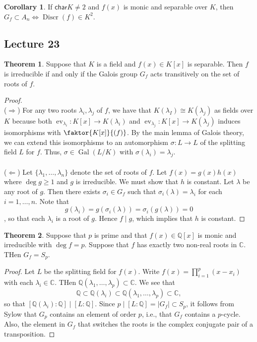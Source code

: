 \documentclass[10pt,letterpaper,cm]{nupset}
\theoremstyle{definition}
\newtheorem{theorem}{Theorem}
\newtheorem{corollary}{Corollary}
\newcommand{\C}{\mathbb C}
\newcommand{\Q}{\mathbb Q}
\newcommand{\1}{\mathbf{1}}
\newcommand{\0}{\vec 0}
\newcommand{\Char}{\mathsf{char}}
\DeclareMathOperator{\gal}{Gal}
\DeclareMathOperator{\ev}{ev}
\DeclareMathOperator{\disc}{Discr}
\begin{document}
\begin{corollary}
If $\Char{K} \ne 2$ and $f(x)$ is monic and separable over $K$, then $G_f \subset A_n \iff \disc(f) \in K^2$. 
\end{corollary}

\subsection{Lecture 23}

\begin{theorem}
Suppose that $K$ is a field and $f(x) \in K[x]$ is separable. Then $f$ is irreducible if and only if the Galois group $G_f$ acts transitively on the set of roots of $f$.  
\end{theorem}
\begin{proof} $ $
\\ ($\Longrightarrow$) For any two roots $\lambda_i, \lambda_j$ of $f$, we have that $K(\lambda_I) \cong K(\lambda_j)$ as fields over $K$ because both $\ev_{\lambda_i} : K[x] \to K(\lambda_i)$ and $\ev_{\lambda_j} : K[x] \to K(\lambda_j)$ induces isomorphisms with $\faktor{K[x]}{(f)}$. By the main lemma of Galois theory, we can extend this isomorphisms to an automorphism $\sigma : L \to L$ of the splitting field $L$ for $f$. Thus, $\sigma \in \gal(L/K)$ with $\sigma(\lambda_i) = \lambda_j$. 
\\ \\
($\Longleftarrow$) Let $\{\lambda_1, \ldots, \lambda_n\}$ denote the set of roots of $f$. Let $f(x) = g(x)h(x)$ where $\deg{g} \geq 1$ and $g$ is irreducible. We must show that $h$ is constant. Let $\lambda$ be any root of $g$. Then there exists $\sigma_i \in G_f$ such that $\sigma_i(\lambda) = \lambda_i$ for each $i=1, \ldots, n$. Note that $$g(\lambda_i) = g(\sigma_i(\lambda))= \sigma_i(g(\lambda)) =0$$, so that each $\lambda_i$ is a root of $g$. Hence $f \mid g$, which implies that $h$ is constant. 
\end{proof}

\begin{theorem}
Suppose that $p$ is prime and that $f(x) \in \Q[x]$ is monic and irreducible with $\deg{f} =p$. Suppose that $f$ has exactly two non-real roots in $\C$. THen $G_f = S_p$.
\end{theorem}
\begin{proof}
Let $L$ be the splitting field for $f(x)$. Write $f(x) = \prod_{i=1}^p(x- x_i)$ with each $\lambda_i \in \C$. THen $\Q(\lambda_1, \ldots, \lambda_p) \subset \C$. We see that $$ \Q \subset \Q(\lambda_i)  \subset \Q(\lambda_1, \ldots, \lambda_p) \subset \C,$$ so that $[\Q(\lambda_i) : \Q] \mid [L : \Q]$.  Since $p \mid [L: \Q] = |G_f| \subset S_p$, it follows from Sylow that $G_p$ contains an element of order $p$, i.e., that $G_f$ contains a $p$-cycle. Also, the element in $G_f$ that switches the roots is the complex conjugate pair of a transposition.
\end{proof}
\end{document}

